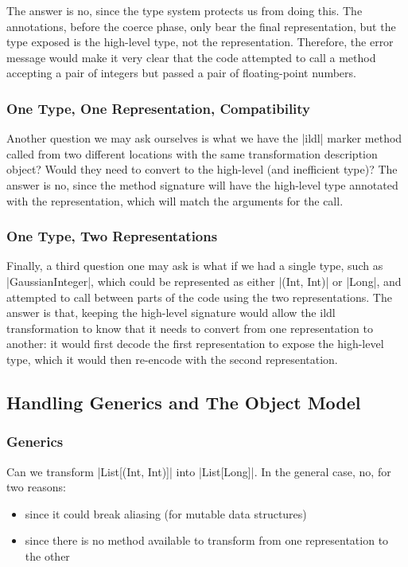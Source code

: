 The answer is no, since the type system protects us from doing this. The annotations, before the coerce phase, only bear the final representation, but the type exposed is the high-level type, not the representation. Therefore, the error message would make it very clear that the code attempted to call a method accepting a pair of integers but passed a pair of floating-point numbers.

\subsubsection{One Type, One Representation, Compatibility}

Another question we may ask ourselves is what we have the |ildl| marker method called from two different locations with the same transformation description object? Would they need to convert to the high-level (and inefficient type)? The answer is no, since the method signature will have the high-level type annotated with the representation, which will match the arguments for the call.

\subsubsection{One Type, Two Representations}

Finally, a third question one may ask is what if we had a single type, such as |GaussianInteger|, which could be represented as either |(Int, Int)| or |Long|, and attempted to call between parts of the code using the two representations. The answer is that, keeping the high-level signature would allow the ildl transformation to know that it needs to convert from one representation to another: it would first decode the first representation to expose the high-level type, which it would then re-encode with the second representation.

\subsection{Handling Generics and The Object Model}
\label{sec:ildl:generics}

\subsubsection{Generics}

Can we transform |List[(Int, Int)]| into |List[Long]|. In the general case, no, for two reasons:
\begin{itemize}
  \item since it could break aliasing (for mutable data structures)
  \item since there is no method available to transform from one representation to the other
\end{itemize}

